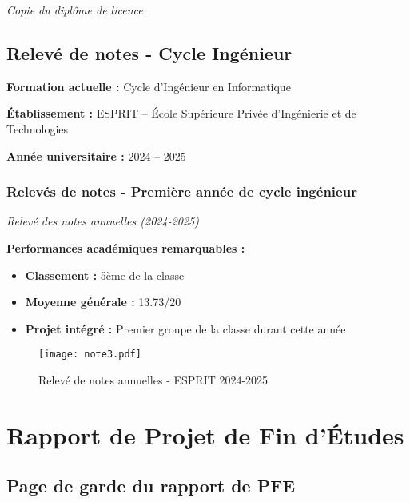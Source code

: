 \documentclass[12pt,a4paper]{article}
\begin{document}
\begin{itemize}


\textit{Copie du diplôme de licence}



\subsection{Relevé de notes - Cycle Ingénieur}

\textbf{Formation actuelle :} Cycle d'Ingénieur en Informatique

\textbf{Établissement :} ESPRIT – École Supérieure Privée d'Ingénierie et de Technologies

\textbf{Année universitaire :} 2024 – 2025

\subsubsection{Relevés de notes - Première année de cycle ingénieur}
\textit{Relevé des notes annuelles (2024-2025)}

\textbf{Performances académiques remarquables :}
\begin{itemize}
    \item \textbf{Classement :} 5ème de la classe
    \item \textbf{Moyenne générale :} 13.73/20
    \item \textbf{Projet intégré :} Premier groupe de la classe durant cette année
\end{itemize}

\vspace{0.5cm}

\begin{figure}[h]
    \centering
    \texttt{[image: note3.pdf]}
    \caption{Relevé de notes annuelles - ESPRIT 2024-2025}
    \label{fig:notes_esprit}
\end{figure}

\newpage

\section{Rapport de Projet de Fin d'Études}
\label{sec:pfe}

\subsection{Page de garde du rapport de PFE}


\end{itemize}
\end{document}
